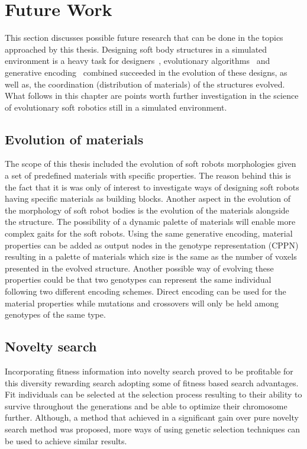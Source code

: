 \section{Future Work} %

This section discusses possible future research that can be done in the topics approached by this thesis. Designing soft body structures in a simulated environment is a heavy task for designers~\citep{cheney2013unshackling}, evolutionary algorithms~\citep{stanley2002evolving} and generative encoding~\citep{stanley2007compositional} combined succeeded in the evolution of these designs, as well as, the coordination (distribution of materials) of the structures evolved. What follows in this chapter are points worth further investigation in the science of evolutionary soft robotics still in a simulated environment.

\subsection*{Evolution of materials}
The scope of this thesis included the evolution of soft robots morphologies given a set of predefined materials with specific properties. The reason behind this is the fact that it is was only of interest to investigate ways of designing soft robots having specific materials as building blocks. Another aspect in the evolution of the morphology of soft robot bodies is the evolution of the materials alongside the structure. The possibility of a dynamic palette of materials will enable more complex gaits for the soft robots. Using the same generative encoding, material properties can be added as output nodes in the genotype representation (CPPN) resulting in a palette of materials which size is the same as the number of voxels presented in the evolved structure. Another possible way of evolving these properties could be that two genotypes can represent the same individual following two different encoding schemes. Direct encoding can be used for the material properties while mutations and crossovers will only be held among genotypes of the same type.

\subsection*{Novelty search}
Incorporating fitness information into novelty search proved to be profitable for this diversity rewarding search adopting some of fitness based search advantages. Fit individuals can be selected at the selection process resulting to their ability to survive throughout the generations and be able to optimize their chromosome further. Although, a method  that achieved in a significant gain over pure novelty search method was proposed, more ways of using genetic selection techniques can be used to achieve similar results.

